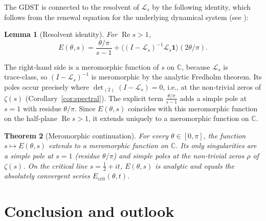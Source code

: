 \documentclass[12pt,a4paper]{article}
\newtheorem{theorem}{Theorem}[section]
\newtheorem{lemma}[theorem]{Lemma}
\theoremstyle{remark}
\begin{document}
The GDST is connected to the resolvent of $\mathcal{L}_s$ by the following identity, which follows from the renewal equation for the underlying dynamical system (see \cite{Geere2026}):

\begin{lemma}[Resolvent identity]\label{lem:resolvent}
For $\operatorname{Re}s>1$,
\[
E(\theta,s) = \frac{\theta/\pi}{s-1} + \bigl\langle (I-\mathcal{L}_s)^{-1}\mathcal{L}_s\mathbf{1}\bigr\rangle (2\theta/\pi).
\]
\end{lemma}

The right‑hand side is a meromorphic function of $s$ on $\mathbb{C}$, because $\mathcal{L}_s$ is trace‑class, so $(I-\mathcal{L}_s)^{-1}$ is meromorphic by the analytic Fredholm theorem.
Its poles occur precisely where $\det_{(2)}(I-\mathcal{L}_s)=0$, i.e., at the non‑trivial zeros of $\zeta(s)$ (Corollary~\ref{cor:spectral}).
The explicit term $\frac{\theta/\pi}{s-1}$ adds a simple pole at $s=1$ with residue $\theta/\pi$.
Since $E(\theta,s)$ coincides with this meromorphic function on the half‑plane $\operatorname{Re}s>1$, it extends uniquely to a meromorphic function on $\mathbb{C}$.

\begin{theorem}[Meromorphic continuation]\label{thm:mero}
For every $\theta\in[0,\pi]$, the function $s\mapsto E(\theta,s)$
extends to a meromorphic function on $\mathbb{C}$.
Its only singularities are a simple pole at $s=1$ (residue $\theta/\pi$)
and simple poles at the non‑trivial zeros $\rho$ of $\zeta(s)$.
On the critical line $s=\frac12+it$, $E(\theta,s)$ is analytic and equals the absolutely convergent series $E_{\mathrm{crit}}(\theta,t)$.
\end{theorem}

\section{Conclusion and outlook}
\label{sec:conclusion}
\end{document}
